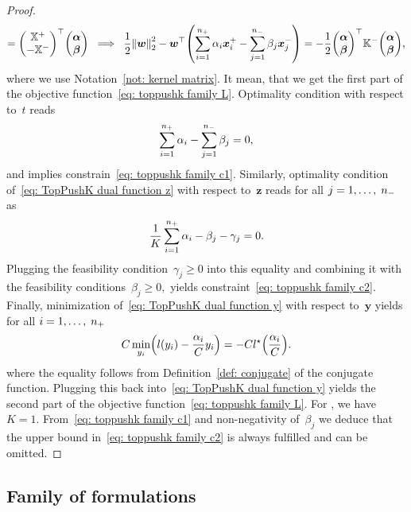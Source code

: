\begin{proof}
\begin{equation*}
      = \Matrix{\X^+ \\ - \X^-}^\top \vecab
    \; \implies \;
    \frac{1}{2} \norm{\bm{w}}_{2}^{2} - \bm{w}^{\top} \Brac{\sum_{i = 1}^{\npos} \alpha_i \bm{x}^+_i - \sum_{j = 1}^{\nneg} \beta_j \bm{x}^-_j}
      = - \frac{1}{2} \vecab^{\top} \Kneg \vecab,
  \end{equation*}
  where we use Notation~\ref{not: kernel matrix}. It mean, that we get the first part of the objective function~\eqref{eq: toppushk family L}. Optimality condition with respect to~$t$ reads 
  \begin{equation*}
    \sum_{i = 1}^{n_{+}} \alpha_i - \sum_{j = 1}^{n_{-}} \beta_j = 0,
  \end{equation*}
  and implies constrain~\eqref{eq: toppushk family c1}. Similarly, optimality condition of~\eqref{eq: TopPushK dual function z} with respect to~$\bm{z}$ reads for all $j = 1, \ldots, \; n_{-}$ as 
  \begin{equation*}
    \frac{1}{K} \sum_{i = 1}^{n_{+}} \alpha_i - \beta_j - \gamma_j = 0.
  \end{equation*}
  Plugging the feasibility condition~$\gamma_j \geq 0$ into this equality and combining it with the feasibility conditions~$\beta_j \geq 0,$ yields constraint~\eqref{eq: toppushk family c2}. Finally, minimization of~\eqref{eq: TopPushK dual function y} with respect to~$\bm{y}$ yields for all $i = 1, \ldots, \; n_{+}$ 
  \begin{equation*}
    C \min_{y_i} \Brac{l(y_i) - \frac{\alpha_i}{C} y_i} = - C l^{\star} \Brac{\frac{\alpha_i}{C}}.
  \end{equation*}
  where the equality follows from Definition~\ref{def: conjugate} of the conjugate function. Plugging this back into~\eqref{eq: TopPushK dual function y} yields the second part of the objective function~\eqref{eq: toppushk family L}. For \TopPush, we have~$K = 1.$ From~\eqref{eq: toppushk family c1} and non-negativity of~$\beta_j$ we deduce that the upper bound in~\eqref{eq: toppushk family c2} is always fulfilled and can be omitted.
\end{proof}

\subsection{Family of \PatMat formulations}

\patdual*

\pagebreak

